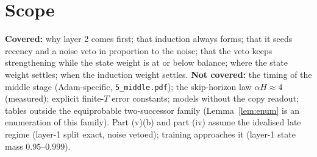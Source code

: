 \documentclass[11pt]{article}
\theoremstyle{definition}\newtheorem{assumption}{Assumption}\newtheorem{definition}{Definition}
\theoremstyle{remark}\newtheorem{remark}{Remark}
\newcommand{\1}{\mathbf{1}}\newcommand{\E}{\mathbb E}
\begin{document}
\section{Scope}
\textbf{Covered:} why layer 2 comes first; that induction always forms; that it seeds recency and a
noise veto in proportion to the noise; that the veto keeps strengthening while the state weight is
at or below balance; where the state weight settles; when the induction weight settles.
\textbf{Not covered:} the timing of the middle stage (Adam-specific, \texttt{5\_middle.pdf}); the skip-horizon
law $\alpha H\approx4$ (measured); explicit finite-$T$ error constants; models without the copy
readout; tables outside the equiprobable two-successor family (Lemma~\ref{lem:enum} is an enumeration
of this family). Part (v)(b) and part (iv) assume the idealised late regime (layer-1 split exact,
noise vetoed); training approaches it (layer-1 state mass $0.95$--$0.999$).
\end{document}
